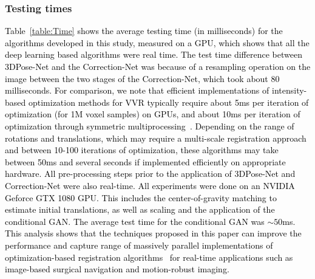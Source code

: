 \documentclass[journal,transmag]{IEEEtran}
\begin{document}
\subsubsection{Testing times}
\label{sec:testtimes}
\textcolor{black}{Table~\ref{table:Time} shows the average testing time (in milliseconds) for the algorithms developed in this study, measured on a GPU, which shows that all the deep learning based algorithms were real time. The test time difference between 3DPose-Net and the Correction-Net was because of a resampling operation on the image between the two stages of the Correction-Net, which took about 80 milliseconds. For comparison, we note that efficient implementations of intensity-based optimization methods for VVR typically require about 5ms per iteration of optimization (for 1M voxel samples) on GPUs, and about 10ms per iteration of optimization through symmetric multiprocessing~\cite{shams2010survey}. Depending on the range of rotations and translations, which may require a multi-scale registration approach and between 10-100 iterations of optimization, these algorithms may take between 50ms and several seconds if implemented efficiently on appropriate hardware. All pre-processing steps prior to the application of 3DPose-Net and Correction-Net were also real-time. \textcolor{black}{All experiments were done on an NVIDIA Geforce GTX 1080 GPU}. This includes the center-of-gravity matching to estimate initial translations, as well as scaling and the application of the conditional GAN. The average test time for the conditional GAN was $\sim50$ms. This analysis shows that the techniques proposed in this paper can improve the performance and capture range of massively parallel implementations of optimization-based registration algorithms~\cite{shams2010survey} for real-time applications such as image-based surgical navigation and motion-robust imaging.}
\end{document}
